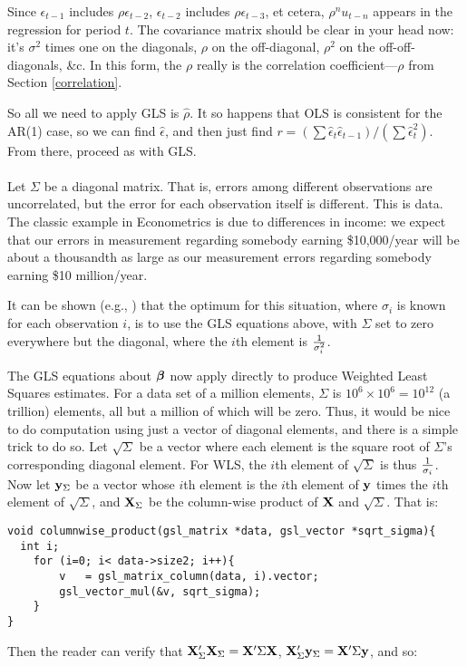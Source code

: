 Since $\epsilon_{t-1}$ includes $\rho\epsilon_{t-2}$, 
$\epsilon_{t-2}$ includes $\rho\epsilon_{t-3}$, et cetera,
$\rho^n u_{t-n}$
appears in the regression for period $t$. The covariance matrix should
be clear in your head now: it's $\sigma^2$ times one on the diagonals,
$\rho$ on the off-diagonal, $\rho^2$ on the off-off-diagonals, \&c. In
this form, the $\rho$ really is the correlation coefficient---$\rho$
from Section \ref{correlation}.

So all we need to apply GLS is $\hat\rho$. It so happens that OLS is
consistent for the AR(1) case, so we can find $\hat\epsilon$, and then
just find $r=(\sum \hat\epsilon_t \hat\epsilon_{t-1})/(\sum
\hat\epsilon_t^2)$. From there, proceed as with GLS.


\paragraph{}
Let $\Sigma$ be a diagonal matrix. That is, errors among different
observations are uncorrelated, but the error for each observation itself
is different. This is  data. The classic example
in Econometrics is due to differences in income: we expect that our
errors in measurement regarding somebody earning \$10,000/year will be
about a thousandth as large as our measurement errors regarding somebody
earning \$10 million/year.

It can be shown (e.g., \citet{kmenta}) that the optimum for this
situation, where $\sigma_i$ is known for each observation $i$, is to use
the GLS equations above, with $\Sigma$ set to zero everywhere but the
diagonal, where the $i$th element is $1\over {\sigma_i^2}$.

The GLS equations about ${\mbox{\boldmath$\beta$}}$ now apply directly to produce Weighted 
Least Squares estimates. For a data set of a million elements,
$\Sigma$ is $10^6 \times 10^6=10^{12}$ (a trillion) elements, all but a
million of which will be zero. Thus, it would be nice to do computation
using just a vector of diagonal elements, and there is a simple trick to
do so. Let $\sqrt\Sigma$ be a vector where each element is the square
root of $\Sigma$'s corresponding diagonal element. For WLS, the $i$th
element of $\sqrt\Sigma$ is thus $1\over {\sigma_i}$. Now let
${\bf y}_\Sigma$ be a vector whose $i$th element 
is the $i$th element of ${\bf y}$ times the $i$th element of
$\sqrt\Sigma$, and 
${\bf X}_\Sigma$ be the column-wise product of ${\bf X}$ and
$\sqrt\Sigma$. That is:
\begin{lstlisting}
void columnwise_product(gsl_matrix *data, gsl_vector *sqrt_sigma){
  int i;
    for (i=0; i< data->size2; i++){
        v   = gsl_matrix_column(data, i).vector;
        gsl_vector_mul(&v, sqrt_sigma);
    }
}
\end{lstlisting}
Then the reader can verify that 
${\bf X}_\Sigma'{\bf X}_\Sigma = {\bf X}' \Sigma {\bf X}$, 
${\bf X}_\Sigma'{\bf y}_\Sigma = {\bf X}' \Sigma {\bf y}$, and so:

